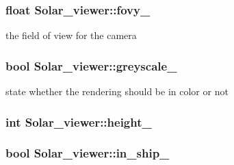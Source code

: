 \subsubsection[{\texorpdfstring{fovy\+\_\+}{fovy_}}]{\setlength{\rightskip}{0pt plus 5cm}float Solar\+\_\+viewer\+::fovy\+\_\+\hspace{0.3cm}{\ttfamily [private]}}\hypertarget{classSolar__viewer_a0ee3e25d0a16f5f8f2be784b42a3b576}{}\label{classSolar__viewer_a0ee3e25d0a16f5f8f2be784b42a3b576}


the field of view for the camera 

\subsubsection[{\texorpdfstring{greyscale\+\_\+}{greyscale_}}]{\setlength{\rightskip}{0pt plus 5cm}bool Solar\+\_\+viewer\+::greyscale\+\_\+\hspace{0.3cm}{\ttfamily [private]}}\hypertarget{classSolar__viewer_ad0da37e7839ea05cd500c59eacfc04cb}{}\label{classSolar__viewer_ad0da37e7839ea05cd500c59eacfc04cb}


state whether the rendering should be in color or not 

\subsubsection[{\texorpdfstring{height\+\_\+}{height_}}]{\setlength{\rightskip}{0pt plus 5cm}int Solar\+\_\+viewer\+::height\+\_\+\hspace{0.3cm}{\ttfamily [private]}}\hypertarget{classSolar__viewer_ae13eeec65d2a4ea4fda382687a4379cd}{}\label{classSolar__viewer_ae13eeec65d2a4ea4fda382687a4379cd}
\subsubsection[{\texorpdfstring{in\+\_\+ship\+\_\+}{in_ship_}}]{\setlength{\rightskip}{0pt plus 5cm}bool Solar\+\_\+viewer\+::in\+\_\+ship\+\_\+\hspace{0.3cm}{\ttfamily [private]}}\hypertarget{classSolar__viewer_a6bed73dabfc1ef5dbf51b1bf6b854a55}{}\label{classSolar__viewer_a6bed73dabfc1ef5dbf51b1bf6b854a55}


